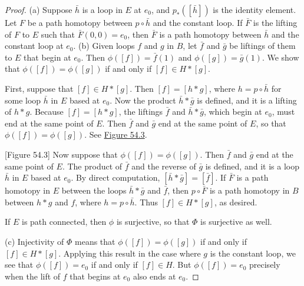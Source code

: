 \begin{proof}
(a) Suppose \(\bar{h}\) is a loop in \(E\) at \(e_{0}\), and \(p_{ * }( [ \bar{h}] )\) is the identity element. Let \(F\) be a path homotopy between \(p \circ \bar{h}\) and the constant loop. If \(\bar{F}\) is the lifting of \(F\) to \(E\) such that \(\bar{F}( {0,0}) = e_{0}\), then \(\bar{F}\) is a path homotopy between \(\bar{h}\) and the constant loop at \(e_{0}\).
(b) Given loops \(f\) and \(g\) in \(B\), let \(\bar{f}\) and \(\bar{g}\) be liftings of them to \(E\) that begin at \(e_{0}\). Then \(\phi ( [ f] ) = \bar{f}(1)\) and \(\phi ( [ g] ) = \bar{g}(1)\). We show that \(\phi ( [ f] ) = \phi ( [ g] )\) if and only if \([ f] \in H * [ g]\).

First, suppose that \([ f] \in H * [ g]\). Then \([ f] = [ {h * g}]\), where \(h = p \circ \bar{h}\) for some loop \(\bar{h}\) in \(E\) based at \(e_{0}\). Now the product \(\bar{h} * \bar{g}\) is defined, and it is a lifting of \(h * g\). Because \([ f] = [ {h * g}]\), the liftings \(\bar{f}\) and \(\bar{h} * \bar{g}\), which begin at \(e_{0}\), must end at the same point of \(E\). Then \(\bar{f}\) and \(\bar{g}\) end at the same point of \(E\), so that \(\phi ( [ f] ) = \phi ( [ g] )\). See \hyperref[fig:54.3]{Figure 54.3}.

[Figure 54.3]
Now suppose that \(\phi ( [ f] ) = \phi ( [ g] )\). Then \(\bar{f}\) and \(\bar{g}\) end at the same point of \(E\). The product of \(\bar{f}\) and the reverse of \(\bar{g}\) is defined, and it is a loop \(\bar{h}\) in \(E\) based at \(e_{0}\). By direct computation, \([ {\bar{h} * \bar{g}}] = [ \bar{f}]\). If \(\bar{F}\) is a path homotopy in \(E\) between the loops \(\bar{h} * \bar{g}\) and \(\bar{f}\), then \(p \circ \bar{F}\) is a path homotopy in \(B\) between \(h * g\) and \(f\), where \(h = p \circ \bar{h}\). Thus \([ f] \in H * [ g]\), as desired.

If \(E\) is path connected, then \(\phi\) is surjective, so that \(\Phi\) is surjective as well.

(c) Injectivity of \(\Phi\) means that \(\phi ( [ f] ) = \phi ( [ g] )\) if and only if \([ f] \in H * [ g]\). Applying this result in the case where \(g\) is the constant loop, we see that \(\phi ( [ f] ) = e_{0}\) if and only if \([ f] \in H\). But \(\phi ( [ f] ) = e_{0}\) precisely when the lift of \(f\) that begins at \(e_{0}\) also ends at \(e_{0}\).
\end{proof}
